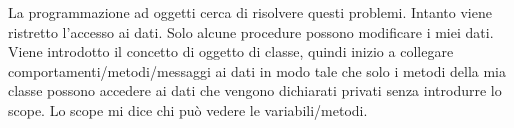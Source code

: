 \par La programmazione ad oggetti cerca di risolvere questi problemi.
Intanto viene ristretto l’accesso ai dati. Solo alcune procedure possono modificare i miei dati. Viene introdotto il concetto di oggetto di classe, quindi inizio a collegare comportamenti/metodi/messaggi ai dati in modo tale che solo i metodi della mia classe possono accedere ai dati che vengono dichiarati privati senza introdurre lo scope. Lo scope mi dice chi può vedere le variabili/metodi.


